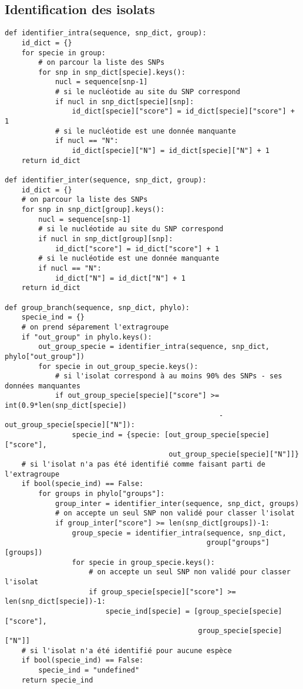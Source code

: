 \subsection{Identification des isolats}
\label{ann:annexeD5}
    \begin{tcolorbox}
        \begin{verbatim}
def identifier_intra(sequence, snp_dict, group):
    id_dict = {}
    for specie in group:
        # on parcour la liste des SNPs
        for snp in snp_dict[specie].keys():
            nucl = sequence[snp-1]
            # si le nucléotide au site du SNP correspond
            if nucl in snp_dict[specie][snp]:
                id_dict[specie]["score"] = id_dict[specie]["score"] + 1
            # si le nucléotide est une donnée manquante
            if nucl == "N":
                id_dict[specie]["N"] = id_dict[specie]["N"] + 1
    return id_dict

def identifier_inter(sequence, snp_dict, group):
    id_dict = {}
    # on parcour la liste des SNPs
    for snp in snp_dict[group].keys():
        nucl = sequence[snp-1]
        # si le nucléotide au site du SNP correspond
        if nucl in snp_dict[group][snp]:
            id_dict["score"] = id_dict["score"] + 1
        # si le nucléotide est une donnée manquante
        if nucl == "N":
            id_dict["N"] = id_dict["N"] + 1
    return id_dict

def group_branch(sequence, snp_dict, phylo):
    specie_ind = {}
    # on prend séparement l'extragroupe
    if "out_group" in phylo.keys():
        out_group_specie = identifier_intra(sequence, snp_dict, phylo["out_group"])
        for specie in out_group_specie.keys():
            # si l'isolat correspond à au moins 90% des SNPs - ses données manquantes
            if out_group_specie[specie]["score"] >= int(0.9*len(snp_dict[specie])
                                                   -out_group_specie[specie]["N"]):
                specie_ind = {specie: [out_group_specie[specie]["score"],
                                       out_group_specie[specie]["N"]]}
    # si l'isolat n'a pas été identifié comme faisant parti de l'extragroupe
    if bool(specie_ind) == False:
        for groups in phylo["groups"]:
            group_inter = identifier_inter(sequence, snp_dict, groups)
            # on accepte un seul SNP non validé pour classer l'isolat
            if group_inter["score"] >= len(snp_dict[groups])-1:
                group_specie = identifier_intra(sequence, snp_dict,
                                                group["groups"][groups])
                for specie in group_specie.keys():
                    # on accepte un seul SNP non validé pour classer l'isolat
                    if group_specie[specie]["score"] >= len(snp_dict[specie])-1:
                        specie_ind[specie] = [group_specie[specie]["score"],
                                              group_specie[specie]["N"]]
    # si l'isolat n'a été identifié pour aucune espèce
    if bool(specie_ind) == False:
        specie_ind = "undefined"
    return specie_ind
        \end{verbatim}
    \end{tcolorbox}
